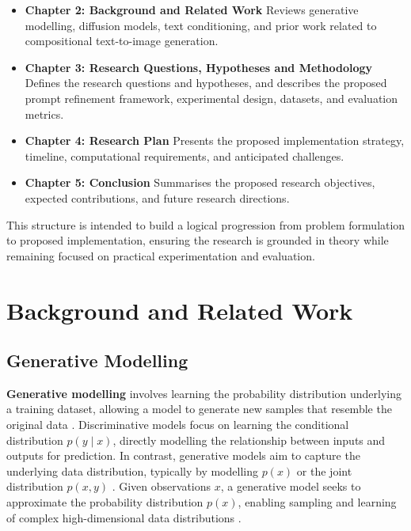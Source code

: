 \documentclass[a4paper,twoside,12pt]{report}
\begin{document}
\begin{itemize}
    \item \textbf{Chapter 2: Background and Related Work}  
    Reviews generative modelling, diffusion models, text conditioning, and prior work related to compositional text-to-image generation.

    \item \textbf{Chapter 3: Research Questions, Hypotheses and Methodology}  
    Defines the research questions and hypotheses, and describes the proposed prompt refinement framework, experimental design, datasets, and evaluation metrics.

    \item \textbf{Chapter 4: Research Plan}  
    Presents the proposed implementation strategy, timeline, computational requirements, and anticipated challenges.

    \item \textbf{Chapter 5: Conclusion}  
    Summarises the proposed research objectives, expected contributions, and future research directions.
\end{itemize}

This structure is intended to build a logical progression from problem formulation to proposed implementation, ensuring the research is grounded in theory while remaining focused on practical experimentation and evaluation.




\chapter{Background and Related Work}


\section{Generative Modelling}

\textbf{Generative modelling} involves learning the probability distribution underlying a training dataset, allowing a model to generate new samples that resemble the original data \citep{goodfellow2016deep, bishop2006pattern}. Discriminative models focus on learning the conditional distribution $p(y \mid x)$, directly modelling the relationship between inputs and outputs for prediction. In contrast, generative models aim to capture the underlying data distribution, typically by modelling $p(x)$ or the joint distribution $p(x, y)$  \citep{murphy2022probabilistic}. Given observations \(x\), a generative model seeks to approximate the probability distribution \(p(x)\), enabling sampling and learning of complex high-dimensional data distributions \citep{bishop2006pattern, kingma2019introduction}.
\end{document}
